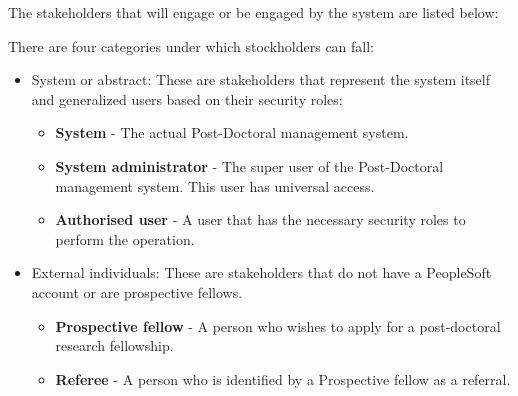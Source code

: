\documentclass[12pt]{article}
\begin{document}
The stakeholders that will engage or be engaged by the system are listed below:

There are four categories under which stockholders can fall:
\begin{itemize}	
\item System or abstract:
These are stakeholders that represent the system itself and generalized users based on their security roles:
\begin{itemize}
\item \textbf{System} - The actual Post-Doctoral management system.
\item \textbf{System administrator} - The super user of the Post-Doctoral management system. This user has universal access.
\item \textbf{Authorised user} - A user that has the necessary security roles to perform the operation.
\end{itemize}
\item External individuals:
These are stakeholders that do not have a PeopleSoft account or are prospective fellows.
\begin{itemize}	
\item \textbf{Prospective fellow} - A person who wishes to apply for a post-doctoral research fellowship.
\item \textbf{Referee} - A person who is identified by a Prospective fellow as a referral.
\end{itemize}


\end{itemize}
\end{document}
